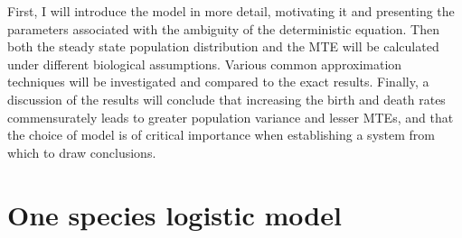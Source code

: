 First, I will introduce the model in more detail, motivating it and presenting the parameters associated with the ambiguity of the deterministic equation. 
Then both the steady state population distribution and the MTE will be calculated under different biological assumptions. 
Various common approximation techniques will be investigated and compared to the exact results. 
Finally, a discussion of the results will conclude that increasing the birth and death rates commensurately leads to greater population variance and lesser MTEs, and that the choice of model is of critical importance when establishing a system from which to draw conclusions. 
\fi


\section{One species logistic model}%

